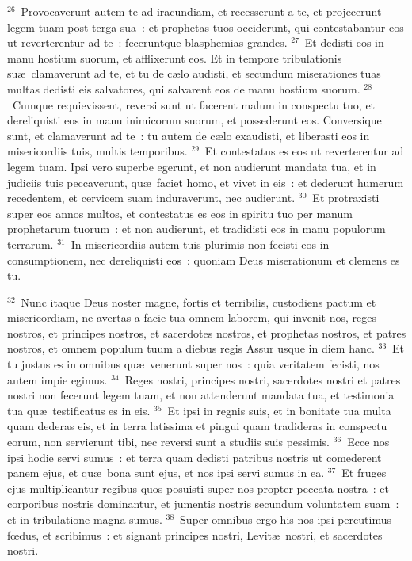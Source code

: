${}^{26}$~Provocaverunt autem te ad iracundiam, et recesserunt a te, et projecerunt legem tuam post terga sua~: et prophetas tuos occiderunt, qui contestabantur eos ut reverterentur ad te~: feceruntque blasphemias grandes.
${}^{27}$~Et dedisti eos in manu hostium suorum, et afflixerunt eos. Et in tempore tribulationis su\ae\ clamaverunt ad te, et tu de c\ae lo audisti, et secundum miserationes tuas multas dedisti eis salvatores, qui salvarent eos de manu hostium suorum.
${}^{28}$~Cumque requievissent, reversi sunt ut facerent malum in conspectu tuo, et dereliquisti eos in manu inimicorum suorum, et possederunt eos. Conversique sunt, et clamaverunt ad te~: tu autem de c\ae lo exaudisti, et liberasti eos in misericordiis tuis, multis temporibus.
${}^{29}$~Et contestatus es eos ut reverterentur ad legem tuam. Ipsi vero superbe egerunt, et non audierunt mandata tua, et in judiciis tuis peccaverunt, qu\ae\ faciet homo, et vivet in eis~: et dederunt humerum recedentem, et cervicem suam induraverunt, nec audierunt.
${}^{30}$~Et protraxisti super eos annos multos, et contestatus es eos in spiritu tuo per manum prophetarum tuorum~: et non audierunt, et tradidisti eos in manu populorum terrarum.
${}^{31}$~In misericordiis autem tuis plurimis non fecisti eos in consumptionem, nec dereliquisti eos~: quoniam Deus miserationum et clemens es tu.


${}^{32}$~Nunc itaque Deus noster magne, fortis et terribilis, custodiens pactum et misericordiam, ne avertas a facie tua omnem laborem, qui invenit nos, reges nostros, et principes nostros, et sacerdotes nostros, et prophetas nostros, et patres nostros, et omnem populum tuum a diebus regis Assur usque in diem hanc.
${}^{33}$~Et tu justus es in omnibus qu\ae\ venerunt super nos~: quia veritatem fecisti, nos autem impie egimus.
${}^{34}$~Reges nostri, principes nostri, sacerdotes nostri et patres nostri non fecerunt legem tuam, et non attenderunt mandata tua, et testimonia tua qu\ae\ testificatus es in eis.
${}^{35}$~Et ipsi in regnis suis, et in bonitate tua multa quam dederas eis, et in terra latissima et pingui quam tradideras in conspectu eorum, non servierunt tibi, nec reversi sunt a studiis suis pessimis.
${}^{36}$~Ecce nos ipsi hodie servi sumus~: et terra quam dedisti patribus nostris ut comederent panem ejus, et qu\ae\ bona sunt ejus, et nos ipsi servi sumus in ea.
${}^{37}$~Et fruges ejus multiplicantur regibus quos posuisti super nos propter peccata nostra~: et corporibus nostris dominantur, et jumentis nostris secundum voluntatem suam~: et in tribulatione magna sumus.
${}^{38}$~Super omnibus ergo his nos ipsi percutimus fœdus, et scribimus~: et signant principes nostri, Levit\ae\ nostri, et sacerdotes nostri.

